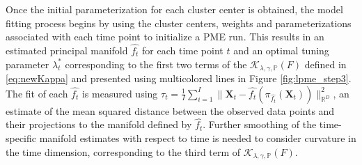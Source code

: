 \documentclass[11pt,reqno]{article}
\theoremstyle{definition}
\begin{document}
Once the initial parameterization for each cluster center is obtained, the model fitting process begins by using the cluster centers, weights and parameterizations associated with each time point to initialize a PME run. This results in an estimated principal manifold $\widehat{f_t}$ for each time point $t$ and an optimal tuning parameter $\lambda_t^*$ corresponding to the first two terms of the $\mathcal{K}_{\lambda, \gamma, \mathbb{P}}(F)$ defined in \eqref{eq:newKappa} and presented using multicolored lines in Figure \ref{fig:lpme_step3}. The fit of each $\widehat{f_t}$ is measured using $\tau_t = \frac{1}{I}\sum_{i=1}^{I}\| \mathbf{X}_t - \widehat{f_t}(\pi_{\widehat{f_t}}(\mathbf{X}_t))\|^{2}_{\mathbb{R}^D}$, an estimate of the mean squared distance between the observed data points and their projections to the manifold defined by $\widehat{f_t}$. Further smoothing of the time-specific manifold estimates with respect to time is needed to consider curvature in the time dimension, corresponding to the third term of $\mathcal{K}_{\lambda, \gamma, \mathbb{P}}(F)$. 
\end{document}
